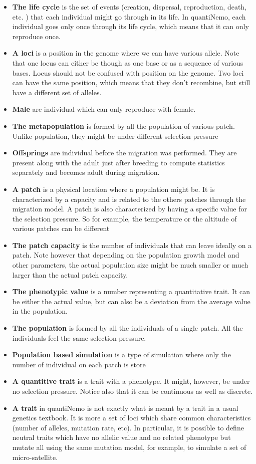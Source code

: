 \documentclass[letterpaper,12pt,oneside]{book}
\begin{document}
\begin{appendices}
\begin{itemize}
\item \textbf{The life cycle } is the set of events (creation, dispersal, reproduction, death, etc. ) that each individual might go through in its life. In quantiNemo, each individual goes only once through its life cycle, which means that it can only reproduce once. 
\item \textbf{A loci} is a position in the genome where we can have various allele. Note that one locus can either be though as one base or as a sequence of various bases. Locus should not be confused with position on the genome. Two loci can have the same position, which means that they don't recombine,  but still have a different set of alleles. 
\item \textbf{Male} are individual which can only reproduce with female. 
\item \textbf{The metapopulation} is formed by all the population of various patch. Unlike population, they might be under different selection pressure
\item \textbf{Offsprings} are individual before the migration was performed. They are present along with the adult just after breeding to compute statistics separately and becomes adult during migration. 
\item \textbf{A patch} is a physical location where a population might be. It is characterized by a capacity and is related to the others patches through the migration model. A patch is also characterized by having a specific value for the selection pressure. So for example, the temperature or the altitude of various patches can be different
\item \textbf{The patch capacity} is the number of individuals that can leave ideally on a patch. Note however that depending on the population growth model and other parameters, the actual population size might be much smaller or much larger than the actual patch capacity.
\item \textbf{The phenotypic value}  is a number representing a quantitative trait. It can be either the actual value, but can also be a deviation from the average value in the population. 
\item \textbf{The population} is formed by all the individuals of a single patch. All the individuals feel the same selection pressure.  
\item \textbf{Population based simulation} is a type of simulation where only the number of individual on each patch is store
\item \textbf{A quantitive trait} is a trait with a phenotype. It might, however, be under no selection pressure. Notice also that it can be continuous as well as discrete. 
\item \textbf{A trait} in quantiNemo is not exactly what is meant by a trait in a usual genetics textbook. It is more a set of loci which share common characteristics (number of alleles, mutation rate, etc). In particular, it is possible to define neutral traits which have no allelic value and no related phenotype but mutate all using the same mutation model, for example, to simulate a set of micro-satellite. 
\end{itemize}



\end{appendices}
\end{document}
